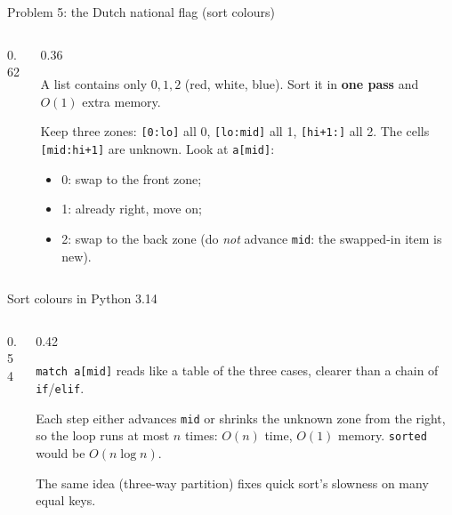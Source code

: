 \documentclass[aspectratio=169,10pt]{beamer}
\begin{document}
\begin{frame}{Problem 5: the Dutch national flag (sort colours)}
\begin{columns}[T]
\begin{column}{0.62\textwidth}
\begin{sfig}[0.86]
\begin{tikzpicture}
  
\end{tikzpicture}
\end{sfig}
\end{column}
\begin{column}{0.36\textwidth}
{\small
A list contains only $0,1,2$ (red, white, blue). Sort it in \textbf{one pass} and $O(1)$ extra memory.

\vspace{2mm}
Keep three zones: \texttt{[0:lo]} all 0, \texttt{[lo:mid]} all 1, \texttt{[hi+1:]} all 2. The cells \texttt{[mid:hi+1]} are unknown. Look at \texttt{a[mid]}:
\begin{itemize}\setlength\itemsep{1pt}
\item 0: swap to the front zone;
\item 1: already right, move on;
\item 2: swap to the back zone (do \emph{not} advance \texttt{mid}: the swapped-in item is new).
\end{itemize}}
\end{column}
\end{columns}
\end{frame}

\begin{frame}{Sort colours in Python 3.14}
\begin{columns}[T]
\begin{column}{0.54\textwidth}
\end{column}
\begin{column}{0.42\textwidth}
\vspace{2mm}
{\small
\texttt{match a[mid]} reads like a table of the three cases, clearer than a chain of \texttt{if}/\texttt{elif}.

\vspace{2mm}
Each step either advances \texttt{mid} or shrinks the unknown zone from the right, so the loop runs at most $n$ times: $O(n)$ time, $O(1)$ memory. \texttt{sorted} would be $O(n\log n)$.

\vspace{2mm}
The same idea (three-way partition) fixes quick sort's slowness on many equal keys.}
\end{column}
\end{columns}
\end{frame}
\end{document}
